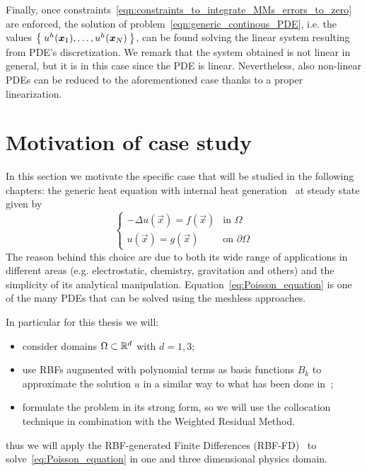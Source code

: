 Finally, once constraints~\eqref{eqn:constraints_to_integrate_MMs_errors_to_zero} are enforced, the solution of problem~\eqref{eqn:generic_continous_PDE}, i.e. the values $\Set{u^h(\boldsymbol{x}_1), \dots, u^h(\boldsymbol{x}_N)}$, can be found solving the linear system  resulting from PDE's discretization. We remark that the system obtained is not linear in general, but it is in this case since the PDE is linear. Nevertheless, also non-linear PDEs can be reduced to the aforementioned case thanks to a proper linearization.

\section{Motivation of case study}
\label{sec:motivation_of_case_study}
In this section we motivate the specific case that will be studied in the following chapters: the generic heat equation with internal heat generation~\cite{Brezis:functional_analysis_book} at steady state given by
\begin{equation}
	\label{eq:Poisson_equation}
	\begin{cases}
		- \Delta u(\vec{x}) = f(\vec{x})														 &  \text{in $\Omega$}							\\
		u(\vec{x}) = g(\vec{x})  																		&  \text{on $\partial\Omega$}
	\end{cases}
\end{equation}
The reason behind this choice are due to both its wide range of applications in different areas	(e.g. electrostatic, chemistry, gravitation and others) and the simplicity of its analytical manipulation. Equation~\eqref{eq:Poisson_equation} is one of the many PDEs that can be solved using the meshless approaches.

In particular for this thesis we will:
\begin{itemize}
	\item consider domains $\Omega \subset \mathbb{R}^{d}$ with $d=1,3$;
	\item use RBFs augmented with polynomial terms as basis functions $B_k$ to approximate the solution $u$ in a similar way to what has been done in~\cite{Liu:Intro_to_meshfree_methods}; 
	\item formulate the problem in its strong form, so we will use the collocation technique in combination with the Weighted Residual Method.
\end{itemize}
thus we will apply the RBF-generated Finite Differences (RBF-FD)~\cite{Fornberg:RBF-FD_1, Fornberg:RBF-FD_2} to solve~\eqref{eq:Poisson_equation} in one and three dimensional physics domain.

